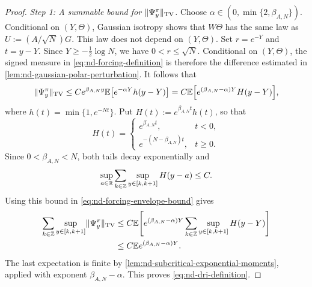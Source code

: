 \documentclass[11pt,reqno,a4paper]{article}
\newcommand{\Ee}{\E}
\begin{document}
\begin{proof}
  \emph{Step 1: A summable bound for $\lVert\Psi_y^\pi\rVert_{\mathrm{TV}}$.}
  Choose $\alpha\in(0,\min\{2,\beta_{A,N}\})$. Conditional on
  $(Y,\Theta)$, Gaussian isotropy shows that $W\Theta$ has the same law as
  $U:=(A/\sqrt N)G$. This law does not depend on $(Y,\Theta)$. Set
  $r=e^{-Y}$ and $t=y-Y$. Since $Y\geq-\frac12\log N$, we have
  $0<r\leq\sqrt N$.
  Conditional on $(Y,\Theta)$, the signed measure in
  \cref{eq:nd-forcing-definition} is therefore the difference estimated in
  \cref{lem:nd-gaussian-polar-perturbation}. It follows that
  \begin{equation}\label{eq:nd-forcing-envelope-bound}
    \norm{\Psi_y^\pi}_{\mathrm{TV}}
    \leq
    C e^{\beta_{A,N}y}
    \Ee\left[
      e^{-\alpha Y}h(y-Y)
    \right]
    =
    C\Ee\left[
      e^{(\beta_{A,N}-\alpha)Y}
      H(y-Y)
    \right],
  \end{equation}
  where $h(t)=\min\{1,e^{-Nt}\}$. Put
  $H(t):=e^{\beta_{A,N}t}h(t)$, so that
  \begin{equation*}
    H(t)
    =
    \begin{cases}
      e^{\beta_{A,N}t}, & t<0,\\
      e^{-(N-\beta_{A,N})t}, & t\geq0.
    \end{cases}
  \end{equation*}
  Since $0<\beta_{A,N}<N$, both tails decay exponentially and
  \begin{equation*}
    \sup_{a\in\mathbb{R}}
    \sum_{k\in\mathbb{Z}}\sup_{y\in[k,k+1]}H(y-a)
    \leq C .
  \end{equation*}
  Using this bound in \cref{eq:nd-forcing-envelope-bound} gives
  \begin{equation*}
    \begin{split}
    \sum_{k\in\Z}
    \sup_{y\in[k,k+1]}\norm{\Psi_y^\pi}_{\mathrm{TV}}
    &\leq
    C\Ee\left[
      e^{(\beta_{A,N}-\alpha)Y}
      \sum_{k\in\Z}
      \sup_{y\in[k,k+1]}H(y-Y)
    \right]
    \\
    &\leq
    C\Ee e^{(\beta_{A,N}-\alpha)Y}.
    \end{split}
  \end{equation*}
  The last expectation is finite by
  \cref{lem:nd-subcritical-exponential-moments}, applied with exponent
  $\beta_{A,N}-\alpha$. This proves \cref{eq:nd-dri-definition}.


\end{proof}
\end{document}
